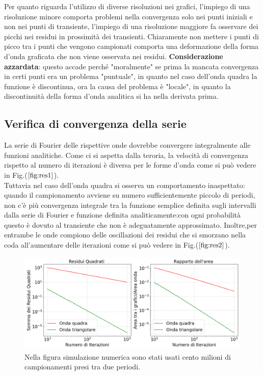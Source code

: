 \documentclass{article}
\begin{document}
        Per quanto riguarda l'utilizzo di diverse risoluzioni nei grafici, l'impiego di una risoluzione 
        minore comporta problemi nella convergenza solo nei punti iniziali e non nei punti di transiente,
        l'impiego di una risoluzione maggiore fa osservare dei picchi nei residui in prossimità dei transienti.
        Chiaramente non mettere i punti di picco tra i punti che vengono campionati 
        comporta una deformazione della forma d'onda graficata che non viene osservata 
        nei residui.
        \textbf{Considerazione azzardata}: questo accade perché "moralmente" se prima la mancata convergenza in certi 
        punti era un problema "puntuale", in quanto nel caso dell'onda quadra la funzione è discontinua, 
        ora la causa del problema è "locale", in quanto la discontinuità della forma d'onda analitica 
        si ha nella derivata prima.




    \subsection{Verifica di convergenza della serie}
    \label{sez:residui}
       
        La serie di Fourier delle rispettive onde dovrebbe convergere integralmente alle funzioni analitiche.
        Come ci si aspetta dalla teroria, la velocità di convergenza rispetto al numero 
        di iterazioni è diversa per le forme d'onda come si può vedere 
        in Fig.($\ref{fig:res1}$).\\ 
        Tuttavia nel caso dell'onda quadra si osserva un comportamento inaspettato:
        quando il campionamento avviene su numero sufficientemente
        piccolo di periodi,  non c'è più convergenza integrale tra la funzione semplice definita sugli 
        intervalli dalla serie di Fourier e funzione definita analiticamente:con ogni
        probabilità questo è dovuto al transiente che non è adeguatamente approssimato.
        Inoltre,per entrambe le onde compiono delle oscillazioni dei residui che si
        smorzano nella coda all'aumentare delle iterazioni come 
        si può vedere in Fig.($\ref{fig:res2}$).
        

        \begin{figure}[H]
            \centering
            \includegraphics[width=1\textwidth]{residuals1.png} %
            \caption{Nella figura simulazione numerica sono stati usati cento milioni di campionamenti presi tra due periodi.}
            \label{fig:res1}
        \end{figure}
\end{document}
